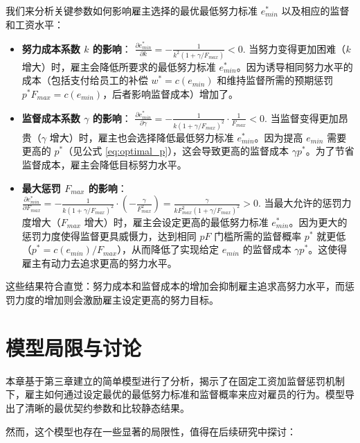 我们来分析关键参数如何影响雇主选择的最优最低努力标准 $e_{min}^*$ 以及相应的监督和工资水平：

\begin{itemize}
    \item \textbf{努力成本系数 $k$ 的影响}：
      $\frac{\partial e_{min}^*}{\partial k} = -\frac{1}{k^2 (1 + \gamma/F_{max})} < 0$.
      当努力变得更加困难（$k$ 增大）时，雇主会降低所要求的最低努力标准 $e_{min}^*$。因为诱导相同努力水平的成本（包括支付给员工的补偿 $w^*=c(e_{min})$ 和维持监督所需的预期惩罚 $p^* F_{max} = c(e_{min})$，后者影响监督成本）增加了。

    \item \textbf{监督成本系数 $\gamma$ 的影响}：
      $\frac{\partial e_{min}^*}{\partial \gamma} = -\frac{1}{k (1 + \gamma/F_{max})^2} \cdot \frac{1}{F_{max}} < 0$.
      当监督变得更加昂贵（$\gamma$ 增大）时，雇主也会选择降低最低努力标准 $e_{min}^*$。因为提高 $e_{min}$ 需要更高的 $p^*$（见公式 \ref{eq:optimal_p}），这会导致更高的监督成本 $\gamma p^*$。为了节省监督成本，雇主会降低目标努力水平。

    \item \textbf{最大惩罚 $F_{max}$ 的影响}：
      $\frac{\partial e_{min}^*}{\partial F_{max}} = -\frac{1}{k (1 + \gamma/F_{max})^2} \cdot (-\frac{\gamma}{F_{max}^2}) = \frac{\gamma}{k F_{max}^2 (1 + \gamma/F_{max})^2} > 0$.
      当最大允许的惩罚力度增大（$F_{max}$ 增大）时，雇主会设定更高的最低努力标准 $e_{min}^*$。因为更大的惩罚力度使得监督更具威慑力，达到相同 $pF$ 门槛所需的监督概率 $p^*$ 就更低（$p^* = c(e_{min})/F_{max}$），从而降低了实现给定 $e_{min}$ 的监督成本 $\gamma p^*$。这使得雇主有动力去追求更高的努力水平。
\end{itemize}

这些结果符合直觉：努力成本和监督成本的增加会抑制雇主追求高努力水平，而惩罚力度的增加则会激励雇主设定更高的努力目标。

\section{模型局限与讨论}
\label{sec:discussion_limitations}

本章基于第三章建立的简单模型进行了分析，揭示了在固定工资加监督惩罚机制下，雇主如何通过设定最优的最低努力标准和监督概率来应对雇员的行为。模型导出了清晰的最优契约参数和比较静态结果。

然而，这个模型也存在一些显著的局限性，值得在后续研究中探讨：

